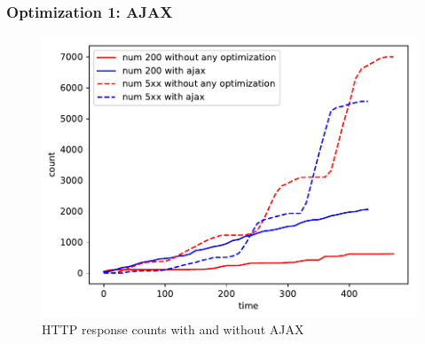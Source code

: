 \begin{frame}
\frametitle{Optimization 1: AJAX}
\begin{figure}[h]
	\centering
	\includegraphics[width=1\textwidth, height=0.8\textheight]{images/without-any-optimization-with-ajax.pdf}
	\caption{HTTP response counts with and without AJAX}\label{fig:sqlopt}
\end{figure}
\end{frame}
